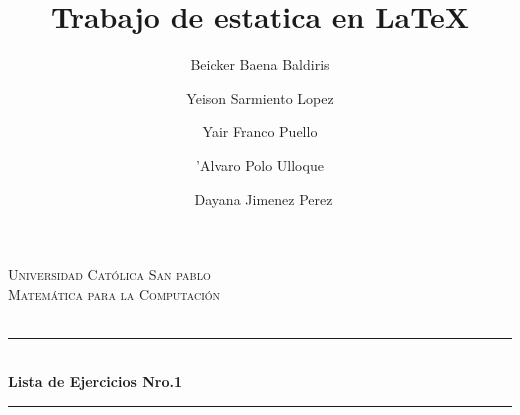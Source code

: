 \documentclass[12pt]{article}
\begin{document}
 
 

\title{Trabajo de estatica en \LaTeX}

\author{Beicker Baena Baldiris \and Yeison Sarmiento Lopez \and Yair Franco Puello \and 'Alvaro Polo Ulloque\and\ Dayana Jimenez Perez} 

\begin{titlepage}

\newcommand{\HRule}{\rule{\linewidth}{0.5mm}} %

\center %
 

\textsc{\LARGE Universidad Cat\'olica San pablo}\\[1.5cm] %
\textsc{\Large Matem\'atica para la Computaci\'on}\\[0.5cm] %
\textsc{\large }\\[0.5cm] %


\HRule \\[0.4cm]
{ \huge \bfseries Lista de Ejercicios Nro.1 }\\[0.4cm] %
\HRule \\[1.5cm]
 


\end{titlepage}
\end{document}
